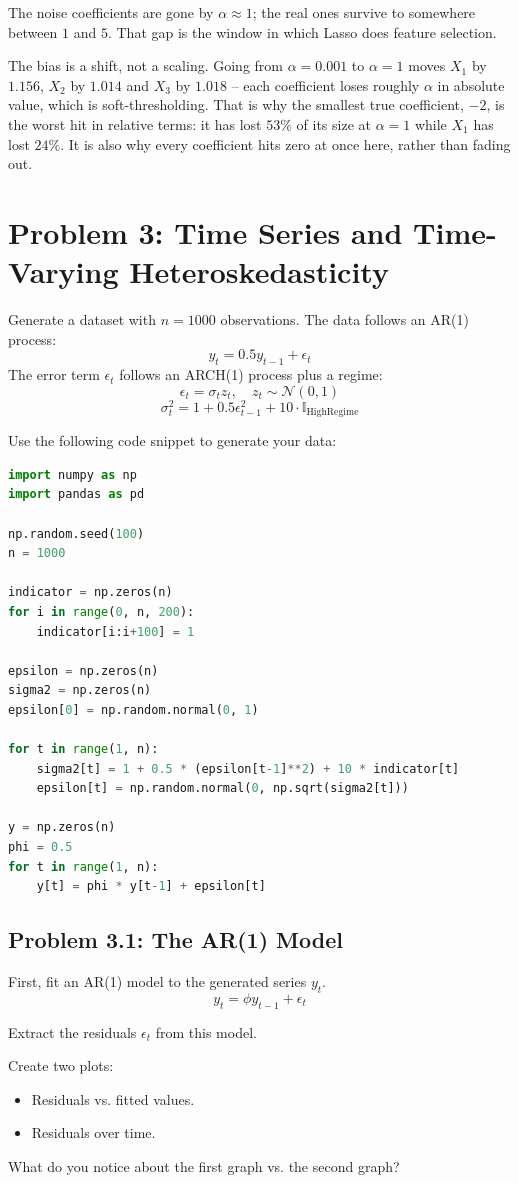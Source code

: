 \documentclass[11pt, letterpaper]{article}
\newcommand{\problem}[1]{\section*{Problem #1}}
\newcommand{\subproblem}[1]{\subsection*{Problem #1}}
\begin{document}
The noise coefficients are gone by $\alpha \approx 1$; the real ones survive to somewhere between
$1$ and $5$. That gap is the window in which Lasso does feature selection.

The bias is a shift, not a scaling. Going from $\alpha = 0.001$ to $\alpha = 1$ moves $X_1$ by
$1.156$, $X_2$ by $1.014$ and $X_3$ by $1.018$ -- each coefficient loses roughly $\alpha$ in
absolute value, which is soft-thresholding. That is why the smallest true coefficient, $-2$, is the
worst hit in relative terms: it has lost $53\%$ of its size at $\alpha = 1$ while $X_1$ has lost
$24\%$. It is also why every coefficient hits zero at once here, rather than fading out.



\problem{3: Time Series and Time-Varying Heteroskedasticity}

Generate a dataset with $n=1000$ observations. 
The data follows an AR(1) process:
$$ y_t = 0.5 y_{t-1} + \epsilon_t $$
The error term $\epsilon_t$ follows an ARCH(1) process plus a regime:
$$ \epsilon_t = \sigma_t z_t, \quad z_t \sim \mathcal{N}(0,1) $$
$$ \sigma_t^2 = 1 + 0.5 \epsilon_{t-1}^2 + 10 \cdot \mathbb{I}_{\text{HighRegime}} $$

Use the following code snippet to generate your data:
    \begin{lstlisting}[language=Python]
import numpy as np
import pandas as pd

np.random.seed(100)
n = 1000

indicator = np.zeros(n)
for i in range(0, n, 200):
    indicator[i:i+100] = 1 

epsilon = np.zeros(n)
sigma2 = np.zeros(n)
epsilon[0] = np.random.normal(0, 1)

for t in range(1, n):
    sigma2[t] = 1 + 0.5 * (epsilon[t-1]**2) + 10 * indicator[t]
    epsilon[t] = np.random.normal(0, np.sqrt(sigma2[t]))

y = np.zeros(n)
phi = 0.5
for t in range(1, n):
    y[t] = phi * y[t-1] + epsilon[t]\end{lstlisting}

\subproblem{3.1: The AR(1) Model}

First, fit an AR(1) model to the generated series $y_t$.
$$
y_t = \phi y_{t-1} + \epsilon_t
$$

Extract the residuals $\epsilon_t$ from this model.

Create two plots:
\begin{itemize}
    \item Residuals vs. fitted values.
    \item Residuals over time.
\end{itemize}
What do you notice about the first graph vs. the second graph?
\end{document}
